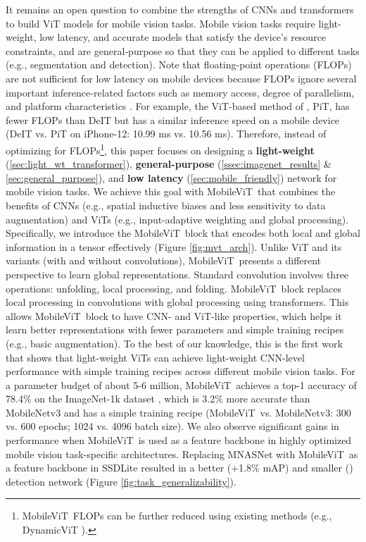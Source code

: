 \documentclass[preprint]{article} \usepackage{iclr2022_conference,times}
\newcommand{\arch}{MobileViT}
\begin{document}
It remains an open question to combine the strengths of CNNs and transformers to build ViT models for mobile vision tasks. Mobile vision tasks require light-weight, low latency, and accurate models that satisfy the device's resource constraints, and are general-purpose so that they can be applied to different tasks (e.g., segmentation and detection). Note that floating-point operations (FLOPs) are not sufficient for low latency on mobile devices because FLOPs ignore several important inference-related factors such as memory access, degree of parallelism, and platform characteristics \citep{ma2018shufflenet}. For example, the ViT-based method of \citet{heo2021rethinking}, PiT, has  fewer FLOPs than DeIT \citep{touvron2021training} but has a similar inference speed on a mobile device (DeIT vs. PiT on iPhone-12: 10.99 ms vs. 10.56 ms). Therefore, instead of optimizing for FLOPs\footnote{\arch~FLOPs can be further reduced using existing methods (e.g., DynamicViT \citep{rao2021dynamicvit}).}, this paper focuses on designing a \textbf{light-weight} (\textsection \ref{sec:light_wt_transformer}), \textbf{general-purpose} (\textsection \ref{ssec:imagenet_results} \& \textsection \ref{sec:general_purpose}), and \textbf{low latency} (\textsection \ref{sec:mobile_friendly}) network for mobile vision tasks. We achieve this goal with \arch~that combines the benefits of CNNs (e.g., spatial inductive biases and less sensitivity to data augmentation) and ViTs (e.g., input-adaptive weighting and global processing). Specifically, we introduce the \arch~block that encodes both local and global information in a tensor effectively (Figure \ref{fig:mvt_arch}). Unlike ViT and its variants (with and without convolutions), \arch~presents a different perspective to learn global representations. Standard convolution involves three operations: unfolding, local processing, and folding. \arch~block replaces local processing in convolutions with global processing using transformers. This allows \arch~block to have CNN- and ViT-like properties, which helps it learn better representations with fewer parameters and simple training recipes (e.g., basic augmentation). To the best of our knowledge, this is the first work that shows that light-weight ViTs can achieve light-weight CNN-level performance with simple training recipes across different mobile vision tasks. For a parameter budget of about 5-6 million, \arch~achieves a top-1 accuracy of 78.4\% on the ImageNet-1k dataset \citep{russakovsky2015imagenet}, which is 3.2\% more accurate than MobileNetv3 and has a simple training recipe (\arch~vs. MobileNetv3: 300 vs. 600 epochs; 1024 vs. 4096 batch size). We also observe significant gains in performance when \arch~is used as a feature backbone in highly optimized mobile vision task-specific architectures. Replacing MNASNet \citep{tan2019mnasnet} with \arch~as a feature backbone in SSDLite \citep{sandler2018mobilenetv2} resulted in a better (+1.8\% mAP) and smaller () detection network (Figure \ref{fig:task_generalizability}).
\end{document}
